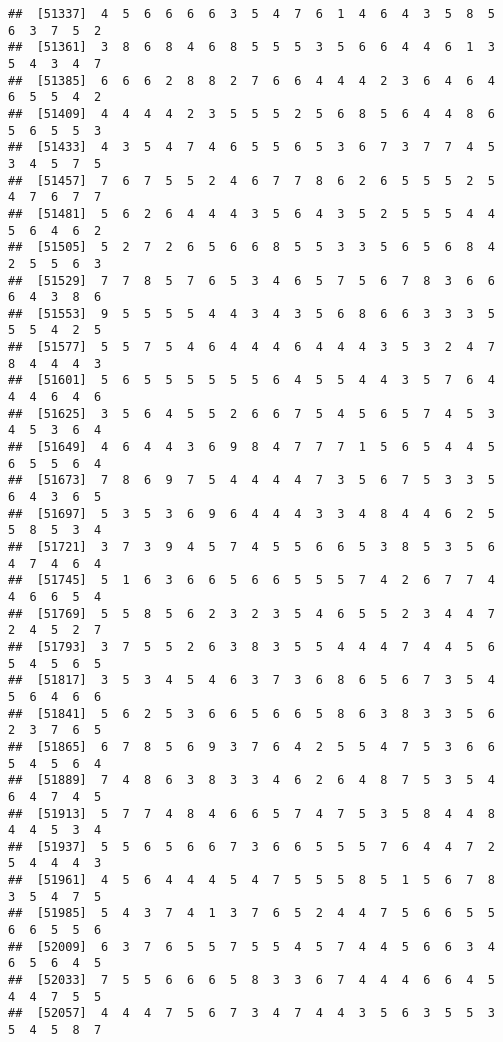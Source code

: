 \documentclass[
]{book}
\begin{document}
\begin{verbatim}
##  [51337]  4  5  6  6  6  6  3  5  4  7  6  1  4  6  4  3  5  8  5  6  3  7  5  2
##  [51361]  3  8  6  8  4  6  8  5  5  5  3  5  6  6  4  4  6  1  3  5  4  3  4  7
##  [51385]  6  6  6  2  8  8  2  7  6  6  4  4  4  2  3  6  4  6  4  6  5  5  4  2
##  [51409]  4  4  4  4  2  3  5  5  5  2  5  6  8  5  6  4  4  8  6  5  6  5  5  3
##  [51433]  4  3  5  4  7  4  6  5  5  6  5  3  6  7  3  7  7  4  5  3  4  5  7  5
##  [51457]  7  6  7  5  5  2  4  6  7  7  8  6  2  6  5  5  5  2  5  4  7  6  7  7
##  [51481]  5  6  2  6  4  4  4  3  5  6  4  3  5  2  5  5  5  4  4  5  6  4  6  2
##  [51505]  5  2  7  2  6  5  6  6  8  5  5  3  3  5  6  5  6  8  4  2  5  5  6  3
##  [51529]  7  7  8  5  7  6  5  3  4  6  5  7  5  6  7  8  3  6  6  6  4  3  8  6
##  [51553]  9  5  5  5  5  4  4  3  4  3  5  6  8  6  6  3  3  3  5  5  5  4  2  5
##  [51577]  5  5  7  5  4  6  4  4  4  6  4  4  4  3  5  3  2  4  7  8  4  4  4  3
##  [51601]  5  6  5  5  5  5  5  5  6  4  5  5  4  4  3  5  7  6  4  4  4  6  4  6
##  [51625]  3  5  6  4  5  5  2  6  6  7  5  4  5  6  5  7  4  5  3  4  5  3  6  4
##  [51649]  4  6  4  4  3  6  9  8  4  7  7  7  1  5  6  5  4  4  5  6  5  5  6  4
##  [51673]  7  8  6  9  7  5  4  4  4  4  7  3  5  6  7  5  3  3  5  6  4  3  6  5
##  [51697]  5  3  5  3  6  9  6  4  4  4  3  3  4  8  4  4  6  2  5  5  8  5  3  4
##  [51721]  3  7  3  9  4  5  7  4  5  5  6  6  5  3  8  5  3  5  6  4  7  4  6  4
##  [51745]  5  1  6  3  6  6  5  6  6  5  5  5  7  4  2  6  7  7  4  4  6  6  5  4
##  [51769]  5  5  8  5  6  2  3  2  3  5  4  6  5  5  2  3  4  4  7  2  4  5  2  7
##  [51793]  3  7  5  5  2  6  3  8  3  5  5  4  4  4  7  4  4  5  6  5  4  5  6  5
##  [51817]  3  5  3  4  5  4  6  3  7  3  6  8  6  5  6  7  3  5  4  5  6  4  6  6
##  [51841]  5  6  2  5  3  6  6  5  6  6  5  8  6  3  8  3  3  5  6  2  3  7  6  5
##  [51865]  6  7  8  5  6  9  3  7  6  4  2  5  5  4  7  5  3  6  6  5  4  5  6  4
##  [51889]  7  4  8  6  3  8  3  3  4  6  2  6  4  8  7  5  3  5  4  6  4  7  4  5
##  [51913]  5  7  7  4  8  4  6  6  5  7  4  7  5  3  5  8  4  4  8  4  4  5  3  4
##  [51937]  5  5  6  5  6  6  7  3  6  6  5  5  5  7  6  4  4  7  2  5  4  4  4  3
##  [51961]  4  5  6  4  4  4  5  4  7  5  5  5  8  5  1  5  6  7  8  3  5  4  7  5
##  [51985]  5  4  3  7  4  1  3  7  6  5  2  4  4  7  5  6  6  5  5  6  6  5  5  6
##  [52009]  6  3  7  6  5  5  7  5  5  4  5  7  4  4  5  6  6  3  4  6  5  6  4  5
##  [52033]  7  5  5  6  6  6  5  8  3  3  6  7  4  4  4  6  6  4  5  4  4  7  5  5
##  [52057]  4  4  4  7  5  6  7  3  4  7  4  4  3  5  6  3  5  5  3  5  4  5  8  7

\end{verbatim}
\end{document}
